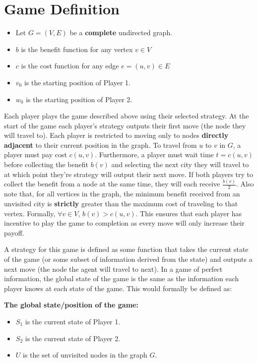 \documentclass[pageno]{jpaper}
\begin{document}
\section{Game Definition}

\begin{itemize}
	\item Let $G = (V, E)$ be a \textbf{complete} undirected graph.
	\item $b$ is the benefit function for any vertex $v \in V$
	\item $c$ is the cost function for any edge $e = (u,v) \in E$
	\item $v_{0}$ is the starting position of Player 1.
	\item $w_{0}$ is the starting position of Player 2.
\end{itemize}

Each player plays the game described above using their selected strategy. At the start of the game each player's strategy outputs their first move (the node they will travel to). Each player is restricted to moving only to nodes \textbf{directly adjacent} to their current position in the graph. To travel from $u$ to $v$ in $G$, a player must pay cost $c(u,v)$. Furthermore, a player must wait time $t = c(u,v)$ before collecting the benefit $b(v)$ and selecting the next city they will travel to at which point they're strategy will output their next move. If both players try to collect the benefit from a node at the same time, they will each receive $\frac{b(v)}{2}$. Also note that, for all vertices in the graph, the minimum benefit received from an unvisited city is \textbf{strictly} greater than the maximum cost of traveling to that vertex. Formally, $\forall v \in V$, $b(v) > c(u,v)$. This ensures that each player has incentive to play the game to completion as every move will only increase their payoff.\par

A strategy for this game is defined as some function that takes the current state of the game (or some subset of information derived from the state) and outputs a next move (the node the agent will travel to next). In a game of perfect information, the global state of the game is the same as the information each player knows at each state of the game. This would formally be defined as:\newpage

\textbf{The global state/position of the game:}\newline

\begin{itemize}
	\item $S_{1}$ is the current state of Player 1.
	\item $S_{2}$ is the current state of Player 2.
	\item $U$ is the set of unvisited nodes in the graph $G$.
\end{itemize}
\end{document}

